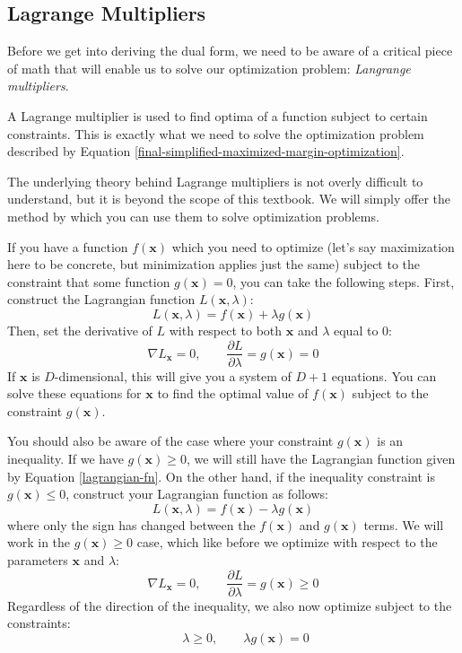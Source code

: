 \subsection{Lagrange Multipliers}
Before we get into deriving the dual form, we need to be aware of a critical piece of math that will enable us to solve our optimization problem: \textit{Langrange multipliers}.

A Lagrange multiplier is used to find optima of a function subject to certain constraints. This is exactly what we need to solve the optimization problem described by Equation \ref{final-simplified-maximized-margin-optimization}.

The underlying theory behind Lagrange multipliers is not overly difficult to understand, but it is beyond the scope of this textbook. We will simply offer the method by which you can use them to solve optimization problems.

If you have a function $f(\textbf{x})$ which you need to optimize (let's say maximization here to be concrete, but minimization applies just the same) subject to the constraint that some function $g(\textbf{x}) = 0$, you can take the following steps. First, construct the Lagrangian function $L(\textbf{x}, \lambda)$:
\begin{equation} \label{lagrangian-fn}
	L(\textbf{x}, \lambda) = f(\textbf{x}) + \lambda g(\textbf{x})
\end{equation}
Then, set the derivative of $L$ with respect to both $\textbf{x}$ and $\lambda$ equal to 0:
\begin{equation*}
	\nabla L_{\textbf{x}} = 0, \qquad \frac{\partial L}{\partial \lambda} = g(\textbf{x}) = 0
\end{equation*}
If $\textbf{x}$ is $D$-dimensional, this will give you a system of $D+1$ equations. You can solve these equations for $\textbf{x}$ to find the optimal value of $f(\textbf{x})$ subject to the constraint $g(\textbf{x})$.

You should also be aware of the case where your constraint $g(\textbf{x})$ is an inequality. If we have $g(\textbf{x}) \geq 0$, we will still have the Lagrangian function given by Equation \ref{lagrangian-fn}. On the other hand, if the inequality constraint is $g(\textbf{x}) \leq 0$, construct your Lagrangian function as follows:
\begin{equation*}
	L(\textbf{x}, \lambda) = f(\textbf{x}) - \lambda g(\textbf{x})
\end{equation*}
where only the sign has changed between the $f(\textbf{x})$ and $g(\textbf{x})$ terms. We will work in the $g(\textbf{x}) \geq 0$ case, which like before we optimize with respect to the parameters $\textbf{x}$ and $\lambda$:
\begin{equation*}
	\nabla L_{\textbf{x}} = 0, \qquad \frac{\partial L}{\partial \lambda} = g(\textbf{x}) \geq 0
\end{equation*}
Regardless of the direction of the inequality, we also now optimize subject to the constraints:
\begin{equation*}
	\qquad \lambda \geq 0, \qquad \lambda g(\textbf{x}) = 0
\end{equation*}

